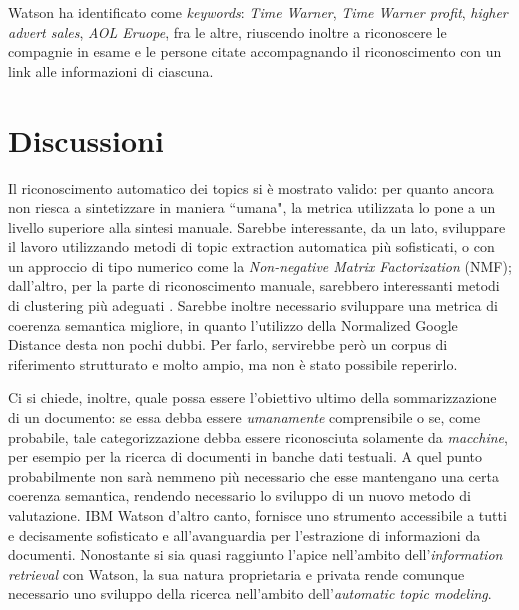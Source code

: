 \documentclass[]{article}
\begin{document}
Watson ha identificato come \textit{keywords}: \textit{Time Warner}, \textit{Time Warner profit}, \textit{higher advert sales}, \textit{AOL Eruope}, fra le altre, riuscendo inoltre a riconoscere le compagnie in esame e le persone citate accompagnando il riconoscimento con un link alle informazioni di ciascuna.
\section{Discussioni}
Il riconoscimento automatico dei topics si è mostrato valido: per quanto ancora non riesca a sintetizzare in maniera ``umana", la metrica utilizzata lo pone a un livello superiore alla sintesi manuale. Sarebbe interessante, da un lato, sviluppare il lavoro utilizzando metodi di topic extraction automatica più sofisticati, o con un approccio di tipo numerico come la \textit{Non-negative Matrix Factorization }(NMF); dall'altro, per la parte di riconoscimento manuale, sarebbero interessanti metodi di clustering più adeguati .
\newline
Sarebbe inoltre necessario sviluppare una metrica di coerenza semantica migliore, in quanto l'utilizzo della Normalized Google Distance desta non pochi dubbi. Per farlo, servirebbe però un corpus di riferimento strutturato e molto ampio, ma non è stato possibile reperirlo.


Ci si chiede, inoltre, quale possa essere l'obiettivo ultimo della sommarizzazione di un documento: se essa debba essere \textit{umanamente} comprensibile o se, come probabile, tale categorizzazione debba essere riconosciuta solamente da \textit{macchine}, per esempio per la ricerca di documenti in banche dati testuali. A quel punto probabilmente non sarà nemmeno più necessario che esse mantengano una certa coerenza semantica, rendendo necessario lo sviluppo di un nuovo metodo di valutazione.
\newline
IBM Watson d'altro canto, fornisce uno strumento accessibile a tutti e decisamente sofisticato e all'avanguardia per l'estrazione di informazioni da documenti. Nonostante si sia quasi raggiunto l'apice nell'ambito dell'\textit{information retrieval} con Watson, la sua natura proprietaria e privata rende comunque necessario uno sviluppo della ricerca nell'ambito dell'\textit{automatic topic modeling}.

\nocite{*}
\printbibliography
\end{document}
